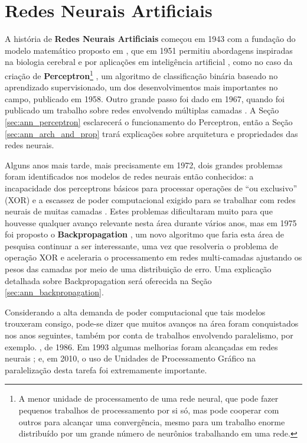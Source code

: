 \chapter{Redes Neurais Artificiais}
\label{cha:ann}


A história de \textbf{Redes Neurais Artificiais} começou em 1943 com a fundação do modelo matemático proposto em \citep{mcculloch1943logical}, que em 1951 permitiu abordagens inspiradas na biologia cerebral e por aplicações em inteligência artificial \citep{kleene1951representation}, como no caso da criação de \textbf{Perceptron}\footnote{A menor unidade de processamento de uma rede neural, que pode fazer pequenos trabalhos de processamento por si só, mas pode cooperar com outros para alcançar uma convergência, mesmo para um trabalho enorme distribuído por um grande número de neurônios trabalhando em uma rede.} \citep{rosenblatt1958perceptron}, um algoritmo de classificação binária baseado no aprendizado supervisionado, um dos desenvolvimentos mais importantes no campo, publicado em 1958. Outro grande passo foi dado em 1967, quando foi publicado um trabalho sobre redes envolvendo múltiplas camadas \citep{ivakhnenko1967cybernetics}. A Seção \ref{sec:ann_perceptron} esclarecerá o funcionamento do Perceptron, então a Seção \ref{sec:ann_arch_and_prop} trará explicações sobre arquitetura e propriedades das redes neurais.

Alguns anos mais tarde, mais precisamente em 1972, dois grandes problemas foram identificados nos modelos de redes neurais então conhecidos: a incapacidade dos perceptrons básicos para processar operações de ``ou exclusivo'' (XOR) e a escassez de poder computacional exigido para se trabalhar com redes neurais de muitas camadas \citep{minsky1972perceptrons}. Estes problemas dificultaram muito para que houvesse qualquer avanço relevante nesta área durante vários anos, mas em 1975 foi proposto o \textbf{Backpropagation} \citep{werbos1975beyond}, um novo algoritmo que faria esta área de pesquisa continuar a ser interessante, uma vez que resolveria o problema de operação XOR e aceleraria o processamento em redes multi-camadas ajustando os pesos das camadas por meio de uma distribuição de erro. Uma explicação detalhada sobre Backpropagation será oferecida na Seção \ref{sec:ann_backpropagation}.

Considerando a alta demanda de poder computacional que tais modelos trouxeram consigo, pode-se dizer que muitos avanços na área foram conquistados nos anos seguintes, também por conta de trabalhos envolvendo paralelismo, por exemplo. \citep{rumelhart1986psychological}, de 1986. Em 1993 algumas melhorias foram alcançadas em redes neurais \citep{180705}; e, em 2010, o uso de Unidades de Processamento Gráfico na paralelização desta tarefa \citep{scherer2010evaluation} foi extremamente importante.

